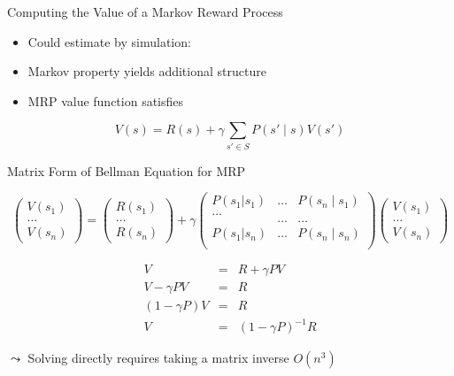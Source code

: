 \begin{frame}[c]{Computing the Value of a Markov Reward Process}
	
	\begin{itemize}
		\item Could estimate by simulation:
		\item Markov property yields additional structure
		\item MRP value function satisfies
	\end{itemize}

$$V(s) = R(s) + \gamma \sum_{s' \in S} P(s'\mid s) V(s')$$
	
\end{frame}
\begin{frame}[c]{Matrix Form of Bellman Equation for MRP}

$$\begin{pmatrix}
V(s_1)\\
\ldots\\
V(s_n)
\end{pmatrix} =
\begin{pmatrix}
R(s_1)\\
\ldots\\
R(s_n)
\end{pmatrix} 
+ \gamma 
\begin{pmatrix}
P(s_1|s_1)  & \ldots &  P(s_n \mid s_1)\\
\ldots\\ 	& \ldots & \ldots \\
P(s_1| s_n) & \ldots & P(s_n \mid s_n)\\
\end{pmatrix} 
\begin{pmatrix}
V(s_1)\\
\ldots\\
V(s_n)
\end{pmatrix} 
$$

\pause

\begin{eqnarray}
V &=& R + \gamma P V\\
V  - \gamma P V &=& R\\
(1- \gamma P) V  &=& R\\
V &=& (1- \gamma P)^{-1} R
\end{eqnarray}

\pause
$\leadsto$ Solving directly requires taking a matrix inverse $O(n^3)$

\end{frame}
